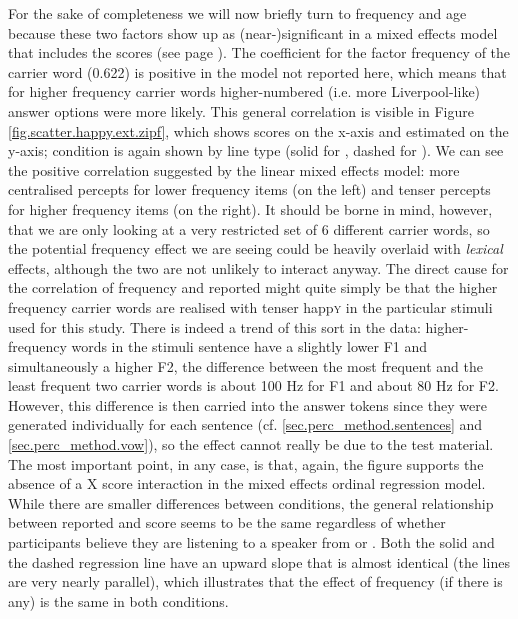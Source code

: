 For the sake of completeness we will now briefly turn to frequency and age because these two factors show up as (near-)significant in a mixed effects model that includes the  scores (see page \pageref{sec.perc_res.happy}).
The coefficient for the factor frequency of the carrier word (0.622) is positive in the model not reported here, which means that for higher frequency carrier words higher-numbered (i.e. more Liverpool-like) answer options were more likely.
This general correlation is visible in Figure \ref{fig.scatter.happy.ext.zipf}, which shows  scores on the x-axis and estimated  on the y-axis;  condition is again shown by line type (solid for , dashed for ).
We can see the positive correlation suggested by the linear mixed effects model: more centralised percepts for lower frequency items (on the left) and tenser percepts for higher frequency items (on the right).
It should be borne in mind, however, that we are only looking at a very restricted set of 6 different carrier words, so the potential frequency effect we are seeing could be heavily overlaid with \emph{lexical} effects, although the two are not unlikely to interact anyway.
The direct cause for the correlation of frequency and reported  might quite simply be that the higher frequency carrier words are realised with tenser happ\textsc{y} in the particular stimuli used for this study.
There is indeed a trend of this sort in the data: higher-frequency words in the stimuli sentence have a slightly lower F1 and simultaneously a higher F2, the difference between the most frequent and the least frequent two carrier words is about 100 Hz for F1 and about 80 Hz for F2.
However, this difference is then carried into the answer tokens since they were generated individually for each sentence (cf. \ref{sec.perc_method.sentences} and \ref{sec.perc_method.vow}), so the effect cannot really be due to the test material.
The most important point, in any case, is that, again, the figure supports the absence of a  X  score interaction in the mixed effects ordinal regression model.
While there are smaller differences between  conditions, the general relationship between reported  and  score seems to be the same regardless of whether participants believe they are listening to a speaker from  or .
Both the solid and the dashed regression line have an upward slope that is almost identical (the lines are very nearly parallel), which illustrates that the effect of frequency (if there is any) is the same in both  conditions.

